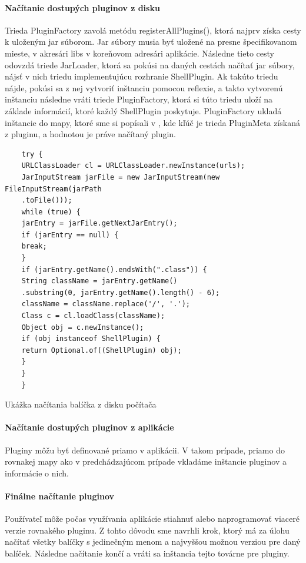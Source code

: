 \paragraph{Načítanie dostupých pluginov z disku} Trieda PluginFactory zavolá metódu registerAllPlugins(), ktorá najprv získa cesty k uloženým jar súborom. Jar súbory musia byť uložené na presne špecifikovanom mieste, v akresári libs v koreňovom adresári aplikácie. Následne tieto cesty odovzdá triede JarLoader, ktorá sa pokúsi na daných cestách načítať \acrshort{jar} súbory, nájsť v nich triedu implementujúcu rozhranie ShellPlugin. Ak takúto triedu nájde, pokúsi sa z nej vytvoriť inštanciu pomocou reflexie, a takto vytvorenú inštanciu následne vráti triede PluginFactory, ktorá si túto triedu uloží na základe informácií, ktoré každý ShellPlugin poskytuje. PluginFactory ukladá inštancie do mapy, ktoré sme si popísali v , kde kľúč je trieda PluginMeta získaná z pluginu, a hodnotou je práve načítaný plugin. 
\begin{algorithm}[H]
	\begin{verbatim}
	try {
	URLClassLoader cl = URLClassLoader.newInstance(urls);
	JarInputStream jarFile = new JarInputStream(new FileInputStream(jarPath
	.toFile()));
	while (true) {
	jarEntry = jarFile.getNextJarEntry();
	if (jarEntry == null) {
	break;
	}
	if (jarEntry.getName().endsWith(".class")) {
	String className = jarEntry.getName()
	.substring(0, jarEntry.getName().length() - 6);
	className = className.replace('/', '.');
	Class c = cl.loadClass(className);
	Object obj = c.newInstance();
	if (obj instanceof ShellPlugin) {
	return Optional.of((ShellPlugin) obj);
	}
	}
	}
	\end{verbatim}
	\caption{Ukážka načítania balíčka z disku počítača}
	\label{alg:gen}
\end{algorithm}
\paragraph{Načítanie dostupých pluginov z aplikácie}
\indent Pluginy môžu byť definované priamo v aplikácii. V takom prípade, priamo do rovnakej mapy ako v predchádzajúcom prípade vkladáme inštancie pluginov a informácie o nich. 
\paragraph{Finálne načítanie pluginov}
\indent Používateľ môže počas využívania aplikácie stiahnuť alebo naprogramovať viaceré verzie rovnakého pluginu. Z tohto dôvodu sme navrhli  krok, ktorý má za úlohu načítať všetky balíčky s jedinečným menom a najvyššou možnou verziou pre daný balíček. Následne načítanie končí a vráti sa inštancia tejto továrne pre pluginy.
